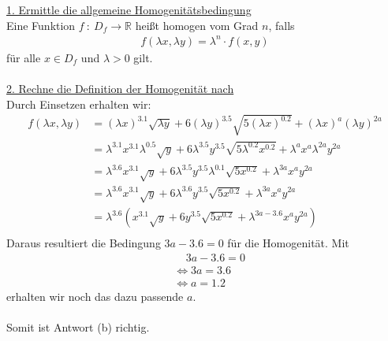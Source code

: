 \underline{1. Ermittle die allgemeine Homogenitätsbedingung} \\
Eine Funktion $f \ : \ D_f  \to \mathbb{R}$ heißt homogen vom Grad $n$, falls
\begin{align*}
f(\lambda x, \lambda y) = \lambda^n \cdot f(x,y)
\end{align*}
für alle $x \in D_f$ und $\lambda > 0$ gilt.
\\
\\

\underline{2. Rechne die Definition der Homogenität nach}\\
Durch Einsetzen erhalten wir:
\begin{align*}
f(\lambda x , \lambda y) 
&= (\lambda x )^{3.1} \sqrt{\lambda y}
	+ 6 (\lambda y)^{3.5} \sqrt{5 (\lambda x)^{0.2}}
	+(\lambda x)^a (\lambda y)^{2a}\\
&= \lambda^{3.1} x^{3.1}  \lambda^{0.5} \sqrt{ y}
	+ 6 \lambda^{3.5} y^{3.5} \sqrt{5 \lambda^{0.2} x^{0.2}}
	+\lambda^a x^a \lambda^{2a} y^{2a}\\
&= \lambda^{3.6} x^{3.1}  \sqrt{ y}
	+ 6 \lambda^{3.5} y^{3.5} \lambda^{0.1} \sqrt{5  x^{0.2}}
	+\lambda^{3a} x^a  y^{2a}\\
&= \lambda^{3.6} x^{3.1}  \sqrt{ y}
	+ 6 \lambda^{3.6} y^{3.5}  \sqrt{5  x^{0.2}}
	+\lambda^{3a} x^a  y^{2a}\\
&= \lambda^{3.6} \left( x^{3.1}  \sqrt{ y}
	+ 6 y^{3.5}  \sqrt{5  x^{0.2}}
	+\lambda^{3a - 3.6} x^a  y^{2a} \right)\\		
\end{align*}
Daraus resultiert die Bedingung $3a - 3.6 = 0$ für die Homogenität.
Mit 
\begin{align*}
&\ \ \ \ \ 3 a - 3.6 = 0\\
&\Leftrightarrow
3a = 3.6\\
&\Leftrightarrow
a = 1.2
\end{align*}
erhalten wir noch das dazu passende $a$.\\
\\
Somit ist Antwort (b) richtig.

\newpage

